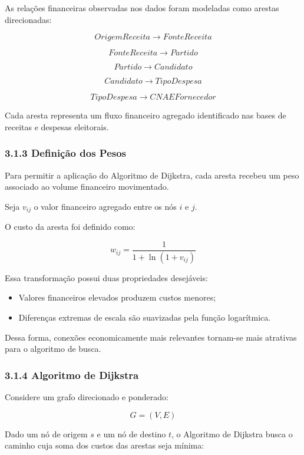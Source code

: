 \documentclass[11pt]{article}
\providecommand{\tightlist}{%
      \setlength{\itemsep}{0pt}\setlength{\parskip}{0pt}}
\begin{document}
As relações financeiras observadas nos dados foram modeladas como
arestas direcionadas:

\[
OrigemReceita \rightarrow FonteReceita
\]

\[
FonteReceita \rightarrow Partido
\]

\[
Partido \rightarrow Candidato
\]

\[
Candidato \rightarrow TipoDespesa
\]

\[
TipoDespesa \rightarrow CNAEFornecedor
\]

Cada aresta representa um fluxo financeiro agregado identificado nas
bases de receitas e despesas eleitorais.

\subsubsection{3.1.3 Definição dos
Pesos}\label{definiuxe7uxe3o-dos-pesos}

Para permitir a aplicação do Algoritmo de Dijkstra, cada aresta recebeu
um peso associado ao volume financeiro movimentado.

Seja \(v_{ij}\) o valor financeiro agregado entre os nós \(i\) e \(j\).

O custo da aresta foi definido como:

\[
w_{ij}=\frac{1}{1+\ln(1+v_{ij})}
\]

Essa transformação possui duas propriedades desejáveis:

\begin{itemize}
\tightlist
\item
  Valores financeiros elevados produzem custos menores;
\item
  Diferenças extremas de escala são suavizadas pela função logarítmica.
\end{itemize}

Dessa forma, conexões economicamente mais relevantes tornam-se mais
atrativas para o algoritmo de busca.

\subsubsection{3.1.4 Algoritmo de Dijkstra}\label{algoritmo-de-dijkstra}

Considere um grafo direcionado e ponderado:

\[
G=(V,E)
\]

Dado um nó de origem \(s\) e um nó de destino \(t\), o Algoritmo de
Dijkstra busca o caminho cuja soma dos custos das arestas seja mínima:
\end{document}
